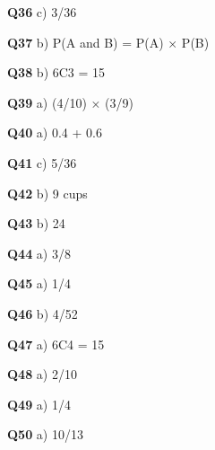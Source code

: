 \textbf{Q36} c) 3/36\par
\textbf{Q37} b) P(A and B) = P(A) × P(B)\par
\textbf{Q38} b) 6C3 = 15\par
\textbf{Q39} a) (4/10) × (3/9)\par
\textbf{Q40} a) 0.4 + 0.6\par
\textbf{Q41} c) 5/36\par
\textbf{Q42} b) 9 cups\par
\textbf{Q43} b) 24\par
\textbf{Q44} a) 3/8\par
\textbf{Q45} a) 1/4\par
\textbf{Q46} b) 4/52\par
\textbf{Q47} a) 6C4 = 15\par
\textbf{Q48} a) 2/10\par
\textbf{Q49} a) 1/4\par
\textbf{Q50} a) 10/13\par